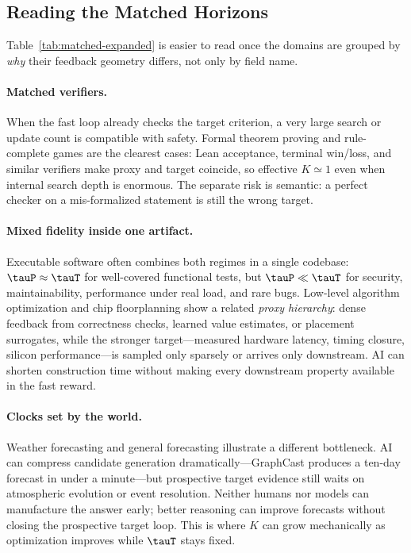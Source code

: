 \subsection{Reading the Matched Horizons}
\label{sec:matched-interpretations}

\small
Table~\ref{tab:matched-expanded} is easier to read once the domains are grouped by \emph{why} their feedback geometry differs, not only by field name.

\paragraph{Matched verifiers.}
When the fast loop already checks the target criterion, a very large search or update count is compatible with safety. Formal theorem proving and rule-complete games are the clearest cases: Lean acceptance, terminal win/loss, and similar verifiers make proxy and target coincide, so effective $K\simeq 1$ even when internal search depth is enormous. The separate risk is semantic: a perfect checker on a mis-formalized statement is still the wrong target.

\paragraph{Mixed fidelity inside one artifact.}
Executable software often combines both regimes in a single codebase: $\tauP\approx\tauT$ for well-covered functional tests, but $\tauP\ll\tauT$ for security, maintainability, performance under real load, and rare bugs. Low-level algorithm optimization and chip floorplanning show a related \emph{proxy hierarchy}: dense feedback from correctness checks, learned value estimates, or placement surrogates, while the stronger target---measured hardware latency, timing closure, silicon performance---is sampled only sparsely or arrives only downstream. AI can shorten construction time without making every downstream property available in the fast reward.

\paragraph{Clocks set by the world.}
Weather forecasting and general forecasting illustrate a different bottleneck. AI can compress candidate generation dramatically---GraphCast produces a ten-day forecast in under a minute---but prospective target evidence still waits on atmospheric evolution or event resolution. Neither humans nor models can manufacture the answer early; better reasoning can improve forecasts without closing the prospective target loop. This is where $K$ can grow mechanically as optimization improves while $\tauT$ stays fixed.

